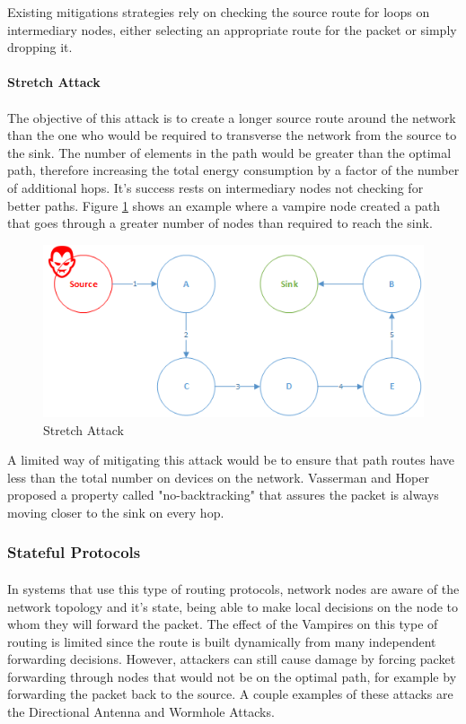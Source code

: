 Existing mitigations strategies rely on checking the source route for loops on intermediary nodes, either selecting an appropriate route for the packet or simply dropping it.

\paragraph{\textbf{Stretch Attack}}
\paragraph{}
The objective of this attack is to create a longer source route around the network than the one who would be required to transverse the network from the source to the sink. The number of elements in the path would be greater than the optimal path, therefore increasing the total energy consumption by a factor of the number of additional hops. It's success rests on intermediary nodes not checking for better paths. Figure \ref{fig:stretch_attack} shows an example where a vampire node created a path that goes through a greater number of nodes than required to reach the sink.

\begin{figure}[h]
  \centering
  \includegraphics[width=0.8\linewidth]{figures/Stretch_Attack.png}
  \caption{Stretch Attack}
  \label{fig:stretch_attack}
\end{figure}

A limited way of mitigating this attack would be to ensure that path routes have less than the total number on devices on the network. Vasserman and Hoper proposed a property called "no-backtracking" that assures the packet is always moving closer to the sink on every hop. \cite{Vasserman2013}

\subsubsection{Stateful Protocols}
\label{sec:tables_routing}
\paragraph{}
In systems that use this type of routing protocols, network nodes are aware of the network topology and it's state, being able to make local decisions on the node to whom they will forward the packet. The effect of the Vampires on this type of routing is limited since the route is built dynamically from many independent forwarding decisions. However, attackers can still cause damage by forcing packet forwarding through nodes that would not be on the optimal path, for example by forwarding the packet back to the source. A couple examples of these attacks are the Directional Antenna and Wormhole Attacks.

